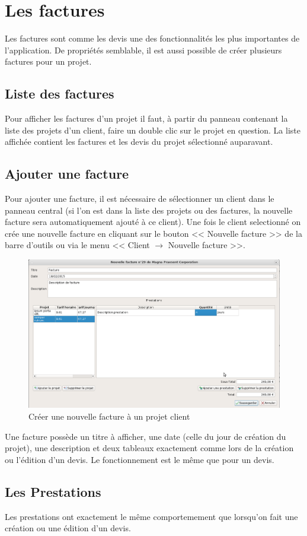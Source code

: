 \chapter{Les factures}
Les factures sont comme les devis une des fonctionnalités les plus importantes de l'application. De propriétés semblable, il est aussi possible de créer plusieurs factures pour un projet.
\section{Liste des factures}
Pour afficher les factures d'un projet il faut, à partir du panneau contenant la liste des projets d'un client, faire un double clic sur le projet en question. La liste affichée contient les factures et les devis du projet sélectionné auparavant.

\section{Ajouter une facture}
Pour ajouter une facture, il est nécessaire de sélectionner un client dans le panneau central (si l'on est dans la liste des projets ou des factures, la nouvelle facture sera automatiquement ajouté à ce client). Une fois le client selectionné on crée une nouvelle facture en cliquant sur le bouton << Nouvelle facture >> de la barre d'outils ou via le menu << Client $\rightarrow$ Nouvelle facture >>. 
\begin{figure}[H]
	\centering
	\includegraphics[width=15cm]{screens/creerFacture.png}
	\caption{Créer une nouvelle facture à un projet client}
\end{figure}
Une facture possède un titre à afficher, une date (celle du jour de création du projet), une description et deux tableaux exactement comme lors de la création ou l'édition d'un devis. Le fonctionnement est le même que pour un devis.
\section{Les Prestations}
Les prestations ont exactement le même comportemement que lorsqu'on fait une création ou une édition d'un devis.